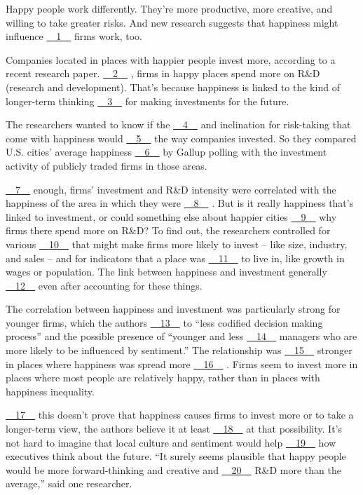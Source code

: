 Happy people work differently. They're more productive, more creative, and willing to take greater risks. And new research suggests that happiness might influence \uline{~~1~~} firms work, too.


Companies located in places with happier people invest more, according to a recent research paper. \uline{~~2~~} , firms in happy places spend more on R\&D (research and development). That's because happiness is linked to the kind of longer-term thinking \uline{~~3~~} for making investments for the future.


The researchers wanted to know if the \uline{~~4~~} and inclination for risk-taking that come with happiness would \uline{~~5~~} the way companies invested. So they compared U.S. cities' average happiness \uline{~~6~~} by Gallup polling with the investment activity of publicly traded firms in those areas.


\uline{~~7~~} enough, firms' investment and R\&D intensity were correlated with the happiness of the area in which they were \uline{~~8~~} . But is it really happiness that's linked to investment, or could something else about happier cities \uline{~~9~~} why firms there spend more on R\&D? To find out, the researchers controlled for various \uline{~~10~~} that might make firms more likely to invest – like size, industry, and sales – and for indicators that a place was \uline{~~11~~} to live in, like growth in wages or population. The link between happiness and investment generally \uline{~~12~~} even after accounting for these things.


The correlation between happiness and investment was particularly strong for younger firms, which the authors \uline{~~13~~} to ``less codified decision making process'' and the possible presence of ``younger and less \uline{~~14~~} managers who are more likely to be influenced by sentiment.'' The relationship was \uline{~~15~~} stronger in places where happiness was spread more \uline{~~16~~} . Firms seem to invest more in places where most people are relatively happy, rather than in places with happiness inequality.


\uline{~~17~~} this doesn't prove that happiness causes firms to invest more or to take a longer-term view, the authors believe it at least \uline{~~18~~} at that possibility. It's not hard to imagine that local culture and sentiment would help \uline{~~19~~} how executives think about the future. ``It surely seems plausible that happy people would be more forward-thinking and creative and \uline{~~20~~} R\&D more than the average,'' said one researcher.